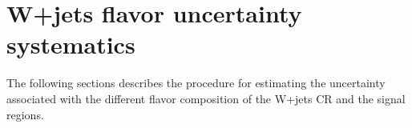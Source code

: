 \section{W+jets flavor uncertainty systematics}
\label{sec:wJetsFlavorUnc}

The following sections describes the procedure for estimating the uncertainty associated with the different flavor composition of the W+jets CR and the signal regions.

